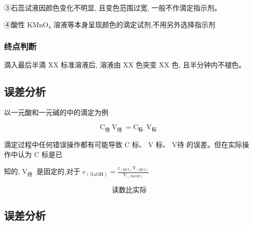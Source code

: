 \documentclass[10pt,cn]{elegantbook}
\begin{document}
③石蕊试液因颜色变化不明显, 且变色范围过宽, 一般不作滴定指示剂。

④酸性 \({\mathrm{{KMnO}}}_{4}\) 溶液等本身呈现颜色的滴定试剂,不用另外选择指示剂

\subsubsection{终点判断}

 滴入最后半滴 XX 标准溶液后, 溶液由 XX 色突变 XX 色, 且半分钟内不褪色。

\begin{center}
\end{center}

\subsection{误差分析}

以一元酸和一元碱的中的滴定为例

\[
{\mathrm{C}}_{\text{待 }}{\mathrm{V}}_{\text{待 }} = {\mathrm{C}}_{\text{标· }}{\mathrm{V}}_{\text{标 }}
\]

滴定过程中任何错误操作都有可能导致 \(\mathrm{C}\) 标、 \(\mathrm{V}\) 标、 \(\mathrm{V}\)待 的误差。但在实际操作中认为 \(\mathrm{C}\) 标是已

知的, \({\mathrm{V}}_{\text{待 }}\) 是固定的,对于 \({\mathrm{c}}_{\left( \mathrm{{NaOH}}\right) }  = \frac{{\mathrm{c}}_{\left( \mathrm{{HCl}}\right) }{\mathrm{V}}_{\left( \mathrm{{HCl}}\right) }}{{\mathrm{V}}_{(NaOH)} } \)


\[\mbox{读数比实际}\]

\subsection{误差分析}
\end{document}
